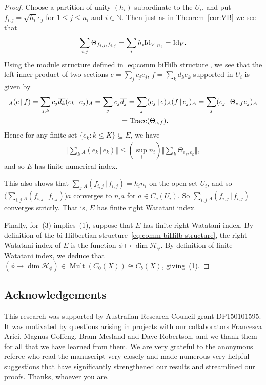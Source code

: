 \documentclass[10pt,a4paper]{amsart}
\numberwithin{equation}{section}
\DeclareMathOperator{\Mult}{Mult} %
\renewcommand{\H}{\mathcal{H}} %
\newcommand{\N}{\mathbb{N}} %
\newcommand{\ol}[1]{\overline{#1}} %
\begin{document}
\begin{proof}
Choose a partition of unity $(h_i)$ subordinate to the $U_i$, and put $f_{i,j} = \sqrt{h_i}e_j$ for $1\leq j \le n_i$ and $i \in \N$. Then just as in Theorem~\ref{cor:VB} we see that
\begin{gather*}
\sum_{i,j}\Theta_{f_{i,j},f_{i,j}}=\sum_ih_i{\rm Id}_{V|_{U_i}}={\rm Id}_V.
\end{gather*}
Using the module structure def\/ined in \eqref{eq:comm biHilb structure}, we see that the left inner product of two sections $e=\sum_jc_je_j$, $f=\sum_kd_ke_k$ supported in $U_i$ is given by
\begin{gather*}
{}_A(e\,|\, f)= \sum_{j,k}c_j\ol{d_k}(e_k\,|\, e_j)_A= \sum_jc_j\ol{d_j}=
 \sum_{j}(e_j\,|\, e)_A(f\,|\, e_j)_A= \sum_j(e_j\,|\,\Theta_{e,f}e_j)_A\\
 \hphantom{{}_A(e\,|\, f)}{} = {\rm Trace}(\Theta_{e,f}).
\end{gather*}
Hence for any f\/inite set $\{e_k \colon k \le K\} \subseteq E$, we have
\begin{gather*}
\Big\Vert \sum_k{}_A(e_k\,|\, e_k)\Big\Vert \leq (\sup_i n_i)\Big\Vert \sum_k\Theta_{e_k,e_k}\Big\Vert,
\end{gather*}
and so $E$ has f\/inite numerical index.

This also shows that $\sum_j{_A(f_{i,j} \,|\, f_{i,j})}=h_in_i$ on the open set $U_i$, and so $\big(\sum_{i,j} {_A(f_{i,j} \,|\, f_{i,j})} \big)a$ converges to $n_i a$ for $a \in C_c(U_i)$. So $\sum_{i,j} {_A(f_{i,j} \,|\, f_{i,j})}$ converges strictly. That is, $E$ has f\/inite right Watatani index.

Finally, for~(3) implies~(1), suppose that $E$ has f\/inite right Watatani index. By def\/inition of the bi-Hilbertian structure~\eqref{eq:comm biHilb structure}, the right Watatani index of $E$ is the function $\phi \mapsto \dim\H_\phi$. By def\/inition of f\/inite Watatani index, we deduce that $(\phi \mapsto \dim\H_\phi) \in \Mult(C_0(X)) \cong C_b(X)$, giving~(1).
\end{proof}

\subsection*{Acknowledgements} This research was supported by Australian Research Council grant DP150101595. It was motivated by questions arising in projects with our collaborators Francesca Arici, Magnus Gof\/feng, Bram Mesland and Dave Robertson, and we thank them for all that we have learned from them. We are very grateful to the anonymous referee who read the manuscript very closely and made numerous very helpful suggestions that have signif\/icantly strengthened our results and streamlined our proofs. Thanks, whoever you are.
\end{document}
